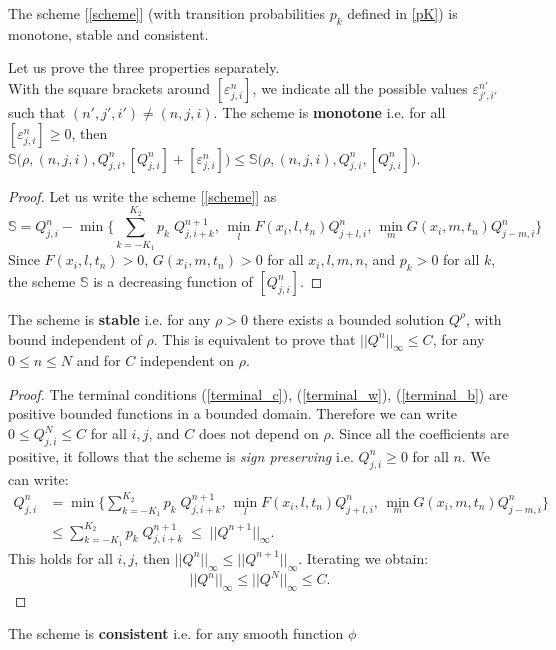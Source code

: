 \begin{Theorem}\label{theorem1}
 The scheme [\ref{scheme}] (with transition probabilities $p_k$ defined in \ref{pK}) is monotone, stable and consistent. 
\end{Theorem}
Let us prove the three properties separately.\\
\noindent
With the square brackets around $[\varepsilon^n_{j,i}]$, we indicate all the possible values $\varepsilon^{n'}_{j',i'}$ such that $(n',j',i')\not=(n,j,i)$. 
The scheme is \textbf{monotone} i.e. for all $[\varepsilon^n_{j,i}] \geq 0$, then 
$\mathbb{S}\bigl(\rho, (n,j,i), Q^{n}_{j,i}, [Q^{n}_{j,i}] + [\varepsilon^n_{j,i}] \bigr) \leq \mathbb{S}\bigl( \rho, (n,j,i), Q^{n}_{j,i}, [Q^{n}_{j,i}] \bigr)$. 
\begin{proof}
Let us write the scheme [\ref{scheme}] as
$$ \mathbb{S} = 
  Q^{n}_{j,i} - \min \biggl\{ \sum_{k = -K_1}^{K_2} p_k \; Q^{n+1}_{j,i+k} , \, \min_{l} F(x_i,l,t_n) Q^n_{j+l,i}, \, \min_{m} G(x_i,m,t_n) Q^n_{j-m,i}  \biggr\} $$
Since $F(x_i,l,t_n) > 0$, $G(x_i,m,t_n) > 0$ for all $x_i, l, m, n$, and $p_k>0$ for all $k$, the scheme $\mathbb{S}$ is a decreasing function of $[Q^{n}_{j,i}]$.
\end{proof}
\noindent
The scheme is \textbf{stable} i.e. for any $\rho>0$ there exists a bounded solution $Q^{\rho}$, with bound independent of $\rho.$ This is equivalent to prove that 
$||Q^n||_{\infty} \leq C$, for any $0\leq n \leq N$ and for $C$ independent on $\rho$.
\begin{proof}
 The terminal conditions (\ref{terminal_c}), (\ref{terminal_w}), (\ref{terminal_b}) are positive bounded functions in a bounded domain.
 Therefore we can write $0 \leq Q^N_{j,i} \leq C$ for all $i,j$, and $C$ does not depend on $\rho$. 
 Since all the coefficients are positive, it follows that the scheme is \emph{sign preserving} i.e.
 $Q^n_{j,i} \geq 0$ for all $n$. We can write:	
\begin{align*}
   Q^{n}_{j,i} &= \min \biggl\{ \sum_{k = -K_1}^{K_2} p_k \; Q^{n+1}_{j,i+k} , \, \min_{l} F(x_i,l,t_n) Q^n_{j+l,i}, \, \min_{m} G(x_i,m,t_n) Q^n_{j-m,i}  \biggr\} \\
	       &\leq \sum_{k = -K_1}^{K_2} p_k \; Q^{n+1}_{j,i+k} \; \leq \; || Q^{n+1} ||_{\infty}.    
\end{align*}
This holds for all $i,j$, then $ || Q^{n} ||_{\infty} \leq || Q^{n+1} ||_{\infty} $. Iterating we obtain: 
$$ || Q^{n} ||_{\infty} \leq || Q^{N} ||_{\infty} \leq C. $$
\end{proof}
\noindent
The scheme is \textbf{consistent} i.e. for any smooth function $\phi$
